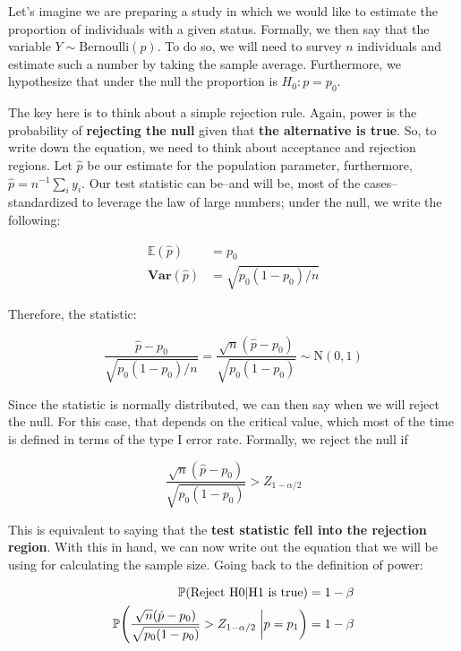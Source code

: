 \documentclass[]{book}
\begin{document}
Let's imagine we are preparing a study in which we would like to estimate the proportion of individuals with a given status. Formally, we then say that the variable \(Y\sim\mbox{Bernoulli}(p)\). To do so, we will need to survey \(n\) individuals and estimate such a number by taking the sample average. Furthermore, we hypothesize that under the null the proportion is \(H_0: p = p_0\).

The key here is to think about a simple rejection rule. Again, power is the probability of \textbf{rejecting the null} given that \textbf{the alternative is true}. So, to write down the equation, we need to think about acceptance and rejection regions. Let \(\hat p\) be our estimate for the population parameter, furthermore, \(\hat p = n^{-1}\sum_i y_i\). Our test statistic can be--and will be, most of the cases--standardized to leverage the law of large numbers; under the null, we write the following:

\begin{align*}
\mathbb{E}(\hat p) & = p_0 \\
\mathbf{Var}(\hat p) & = \sqrt{p_0(1-p_0)/n}
\end{align*}

Therefore, the statistic:

\begin{equation*}
\frac{\hat p - p_0}{\sqrt{p_0(1-p_0)/n}} = \frac{\sqrt{n}(\hat p - p_0)}{\sqrt{p_0(1-p_0)}} \sim \mbox{N}(0, 1)
\end{equation*}

Since the statistic is normally distributed, we can then say when we will reject the null. For this case, that depends on the critical value, which most of the time is defined in terms of the type I error rate. Formally, we reject the null if

\begin{equation*}
\frac{\sqrt{n}(\hat p - p_0)}{\sqrt{p_0(1-p_0)}} > Z_{1-\alpha/2}
\end{equation*}

This is equivalent to saying that the \textbf{test statistic fell into the rejection region}. With this in hand, we can now write out the equation that we will be using for calculating the sample size. Going back to the definition of power:

\begin{align*}
\mathbb{P}{(\mbox{Reject H0}|\mbox{H1 is true})} & = 1-\beta \\
\mathbb{P}{\left(\frac{\sqrt{n}(\hat p - p_0)}{\sqrt{p_0(1-p_0)}} > Z_{1-\alpha/2}\right.\left|\vphantom{\frac{1}{2}}p = p_1\right)} & = 1 - \beta
\end{align*}
\end{document}
